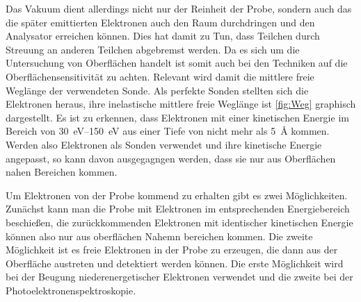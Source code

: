         Das Vakuum dient allerdings nicht nur der Reinheit der Probe, sondern auch das die später emittierten Elektronen auch den Raum durchdringen und den Analysator erreichen können.
        Dies hat damit zu Tun, dass Teilchen durch Streuung an anderen Teilchen abgebremst werden.
        Da es sich um die Untersuchung von Oberflächen handelt ist somit auch bei den Techniken auf die Oberflächensensitivität zu achten.
        Relevant wird damit die mittlere freie Weglänge der verwendeten Sonde.
        Als perfekte Sonden stellten sich die Elektronen heraus, ihre inelastische mittlere freie Weglänge ist \autoref{fig:Weg} graphisch dargestellt.
        Es ist zu erkennen, dass Elektronen mit einer kinetischen Energie im Bereich von \SIrange{30}{150}{\electronvolt} aus einer Tiefe von nicht mehr als \SI{5}{\angstrom} kommen.
        Werden also Elektronen als Sonden verwendet und ihre kinetische Energie angepasst, so kann davon ausgegagngen werden, dass sie nur aus Oberflächen nahen Bereichen kommen.

        Um Elektronen von der Probe kommend zu erhalten gibt es zwei Möglichkeiten.
        Zunächst kann man die Probe mit Elektronen im entsprechenden Energiebereich beschießen, die zurückkommenden Elektronen mit identischer kinetischen Energie können also nur aus oberflächen Nahemn bereichen kommen.
        Die zweite Möglichkeit ist es freie Elektronen in der Probe zu erzeugen, die dann aus der Oberfläche austreten und detektiert werden können.
        Die erste Möglichkeit wird bei der Beugung niederenergetischer Elektronen verwendet und die zweite bei der Photoelektronenspektroskopie.


